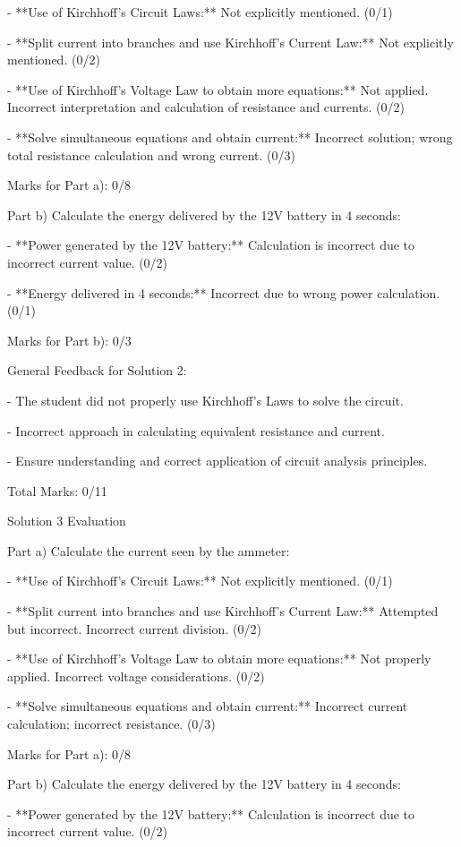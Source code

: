 \documentclass[a4paper,11pt]{article}
\begin{document}
- **Use of Kirchhoff's Circuit Laws:** Not explicitly mentioned. (0/1)

- **Split current into branches and use Kirchhoff’s Current Law:** Not explicitly mentioned. (0/2)

- **Use of Kirchhoff’s Voltage Law to obtain more equations:** Not applied. Incorrect interpretation and calculation of resistance and currents. (0/2)

- **Solve simultaneous equations and obtain current:** Incorrect solution; wrong total resistance calculation and wrong current. (0/3)

Marks for Part a): 0/8

Part b) Calculate the energy delivered by the 12V battery in 4 seconds:

- **Power generated by the 12V battery:**
Calculation is incorrect due to incorrect current value. (0/2)

- **Energy delivered in 4 seconds:** Incorrect due to wrong power calculation. (0/1)

Marks for Part b): 0/3

General Feedback for Solution 2:

- The student did not properly use Kirchhoff's Laws to solve the circuit.

- Incorrect approach in calculating equivalent resistance and current.

- Ensure understanding and correct application of circuit analysis principles.

Total Marks: 0/11

Solution 3 Evaluation

Part a) Calculate the current seen by the ammeter:

- **Use of Kirchhoff's Circuit Laws:** Not explicitly mentioned. (0/1)

- **Split current into branches and use Kirchhoff’s Current Law:** Attempted but incorrect. Incorrect current division. (0/2)

- **Use of Kirchhoff’s Voltage Law to obtain more equations:** Not properly applied. Incorrect voltage considerations. (0/2)

- **Solve simultaneous equations and obtain current:** Incorrect current calculation; incorrect resistance. (0/3)

Marks for Part a): 0/8

Part b) Calculate the energy delivered by the 12V battery in 4 seconds:

- **Power generated by the 12V battery:** Calculation is incorrect due to incorrect current value. (0/2)
\end{document}

